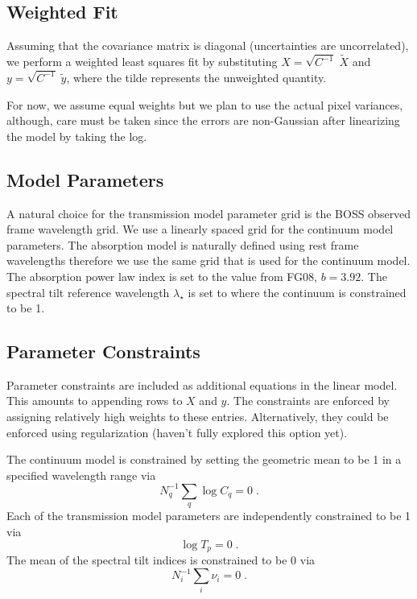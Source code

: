 \documentclass[oneside,10pt]{article}
\providecommand{\var}{\mathrm{var}}
\begin{document}
\subsection{Weighted Fit}

Assuming that the covariance matrix is diagonal (uncertainties are uncorrelated), we perform a weighted 
least squares fit by substituting $X = \sqrt{C^{-1}} \; \tilde{X}$ and $y = \sqrt{C^{-1}} \; \tilde{y}$, 
where the tilde represents the unweighted quantity. 

For now, we assume equal weights but we plan to use the actual pixel variances, although, care must 
be taken since the errors are non-Gaussian after linearizing the model by taking the log.

%
%

\subsection{Model Parameters}

A natural choice for the transmission model parameter grid is the BOSS observed frame wavelength grid. 
We use a linearly spaced grid for the continuum model parameters. The absorption model is naturally defined using rest frame 
wavelengths therefore we use the same grid that is used for the continuum model. The absorption power law index
is set to the value from FG08, $b = 3.92$.
The spectral tilt reference wavelength $\lambda_\star$ is set to where the continuum is constrained to be 1.

\subsection{Parameter Constraints}

Parameter constraints are included as additional equations in the linear model. This amounts to appending rows to $X$ and $y$. 
The constraints are enforced by assigning relatively high weights to these entries. Alternatively, they could be enforced using
regularization (haven't fully explored this option yet).

The continuum model is constrained by setting the geometric mean to be 1 in a specified wavelength range via 
\begin{equation}
N_q^{-1} \sum_q \log C_q =  0 \; .
\end{equation}
Each of the transmission model parameters are independently constrained to be 1 via
\begin{equation}
\log T_p = 0 \; .
\end{equation}
The mean of the spectral tilt indices is constrained to be 0 via
\begin{equation}
N_i^{-1} \sum_i \nu_i = 0 \; .
\end{equation}
\end{document}
